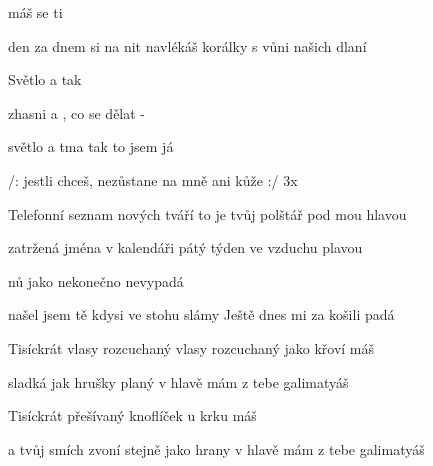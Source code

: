 

\zs
{}   máš    se ti 

den za dnem si na nit navlékáš korálky s vůni našich dlaní
\ks

\zr
Světlo a  tak   

zhasni a , co se dělat -

světlo a tma tak to jsem já

/: jestli chceš, nezůstane na mně ani kůže :/ 3x
\kr

\zs
Telefonní seznam nových tváří
to je tvůj polštář pod mou hlavou

zatržená jména v kalendáři
pátý týden ve vzduchu plavou
\ks

\zr  \kr

\zs
{}nů  
jako nekonečno nevypadá

našel jsem tě kdysi ve stohu slámy
Ještě dnes mi za košili padá
\ks

\zs
Tisíckrát vlasy rozcuchaný
vlasy rozcuchaný jako křoví máš

sladká jak hrušky planý
v hlavě mám z tebe galimatyáš
\ks

\zs
Tisíckrát přešívaný
knoflíček u krku máš

a tvůj smích zvoní stejně jako hrany
v hlavě mám z tebe galimatyáš
\ks

\kp






















